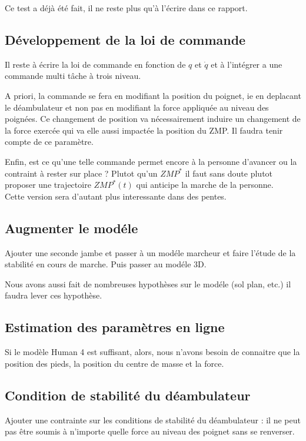 \documentclass[a4paper, 10pt ]{article}
\begin{document}
Ce test a déjà été fait, il ne reste plus qu'à l'écrire dans ce rapport.


\subsection{Développement de la loi de commande}

Il reste à écrire la loi de commande en fonction de $q$ et $\dot{q}$ et à l'intégrer a une commande multi tâche à trois niveau.

A priori, la commande se fera en modifiant la position du poignet, ie en deplacant le déambulateur et non pas en modifiant la force appliquée au niveau des poignées. Ce changement de position va nécessairement induire un changement de la force exercée qui va elle aussi impactée la position du ZMP. Il faudra tenir compte de ce paramètre.

Enfin, est ce qu'une telle commande permet encore à la personne d'avancer ou la contraint à rester sur place ? 
Plutot qu'un $ZMP^*$ il faut sans doute plutot proposer une trajectoire  $ZMP^*(t)$ qui anticipe la marche de la personne.\\
Cette version sera d'autant plus interessante dans des pentes.

\subsection{Augmenter le modéle}

Ajouter une seconde jambe et passer à un modéle marcheur et faire l'étude de la stabilité en cours de marche. Puis passer au modéle 3D.

Nous avons aussi fait de nombreuses hypothèses sur le modéle (sol plan, etc.) il faudra lever ces hypothèse.

\subsection{Estimation des paramètres en ligne}

Si le modèle Human 4 est suffisant, alors, nous n'avons besoin de connaitre que la position des pieds, la position du centre de masse et la force.

\subsection{Condition de stabilité du déambulateur}

Ajouter une contrainte sur les conditions de stabilité du déambulateur : il ne peut pas être soumis à n'importe quelle force au niveau des poignet sans se renverser.
\end{document}
